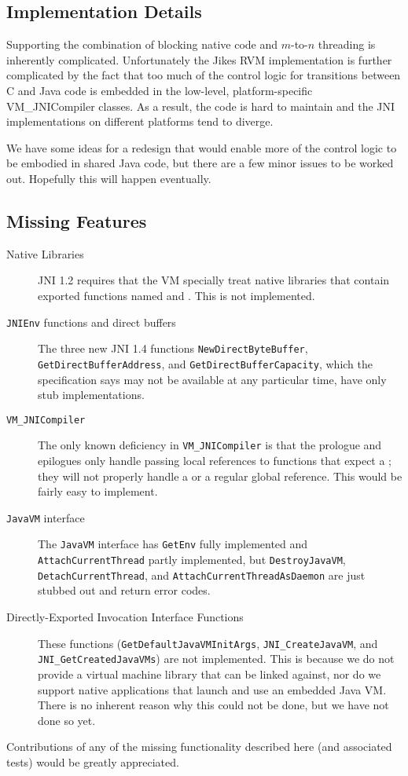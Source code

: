 \subsection{Implementation Details}
Supporting the combination of blocking native code and $m$-to-$n$
threading is inherently complicated.  Unfortunately the Jikes RVM
implementation is further complicated by the fact that too much of the
control logic for transitions between C and Java code is embedded in
the low-level, platform-specific {VM\_JNICompiler} classes.  As a
result, the code is hard to maintain and the JNI implementations
on different platforms tend to diverge. 

We have some ideas for a redesign that would enable more of the
control logic to be embodied in shared Java code, but there are a few
minor issues to be worked out.  Hopefully this will happen eventually.

\subsection{Missing Features}

\begin{description}

\item[Native Libraries]
JNI 1.2 requires that the VM specially treat native libraries that
contain exported functions named
 and .  This is not
implemented. 

\item[\texttt{JNIEnv} functions and direct buffers] 
  The three new JNI 1.4 functions
\texttt{NewDirectByteBuffer}, \texttt{GetDirectBufferAddress}, and
\texttt{GetDirectBufferCapacity}, which the specification says may not
be available at any particular time, have only stub implementations. 

\item[\texttt{VM\_JNICompiler}] The only known deficiency in \texttt{VM\_JNICompiler} is that the
prologue and epilogues only handle passing local references to
functions that expect a ; they will not properly
handle a  or a regular global reference.  This would be
fairly easy to implement.

\item[\texttt{JavaVM} interface]
The \texttt{JavaVM} interface has \texttt{GetEnv} fully
implemented and \texttt{AttachCurrentThread} partly implemented, but
\texttt{DestroyJavaVM}, \texttt{DetachCurrentThread}, and
\texttt{AttachCurrentThreadAsDaemon} are just stubbed out and return
error codes.

\item[{Directly-Exported Invocation Interface Functions}] These
functions (\texttt{GetDefaultJavaVMInitArgs},
\texttt{JNI\_CreateJavaVM}, and \texttt{JNI\_GetCreatedJavaVMs}) are not
implemented.  This is because we do not provide a virtual machine
library that can be linked against, nor do we support native
applications that launch and use an embedded Java VM.  There is no
inherent reason why this could not be done, but we have not done so
yet.  

\end{description}

Contributions of any of the missing functionality described here (and
associated tests) would be greatly appreciated.

